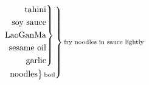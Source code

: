 \documentclass[12pt]{standalone}
\begin{document}
\[
\begin{rcases}\begin{alignedat}{3}
\begin{rcases}\begin{alignedat}{3}
\text{tahini}\\
\text{soy sauce}\\
\text{LaoGanMa}\\
\text{sesame oil}\\
\text{garlic}\\
\end{alignedat}\end{rcases}
\substack{\text{}}\\
\begin{rcases}\begin{alignedat}{3}
\text{noodles}\\
\end{alignedat}\end{rcases}
\substack{\text{boil}}\\
\end{alignedat}\end{rcases}
\substack{\text{fry noodles in sauce lightly}}\\
\]
\end{document}

